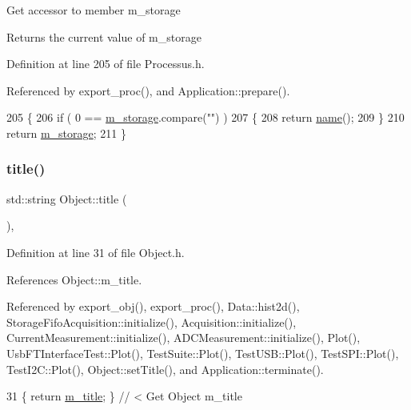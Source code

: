 Get accessor to member m\+\_\+storage \begin{DoxyReturn}{Returns}
the current value of m\+\_\+storage 
\end{DoxyReturn}


Definition at line 205 of file Processus.\+h.



Referenced by export\+\_\+proc(), and Application\+::prepare().


\begin{DoxyCode}
205                        \{
206     \textcolor{keywordflow}{if} ( 0 == \hyperlink{classProcessus_a132b1e71f72327e5a87f0a168c7b6325}{m\_storage}.compare(\textcolor{stringliteral}{""}) )
207     \{
208       \textcolor{keywordflow}{return} \hyperlink{classObject_a300f4c05dd468c7bb8b3c968868443c1}{name}();
209     \}
210     \textcolor{keywordflow}{return} \hyperlink{classProcessus_a132b1e71f72327e5a87f0a168c7b6325}{m\_storage};
211   \}
\end{DoxyCode}
\mbox{\label{classObject_a73a0f1a41828fdd8303dd662446fb6c3}} 
\subsubsection{\texorpdfstring{title()}{title()}}
{\footnotesize\ttfamily std\+::string Object\+::title (\begin{DoxyParamCaption}{ }\end{DoxyParamCaption})\hspace{0.3cm}{\ttfamily [inline]}, {\ttfamily [inherited]}}



Definition at line 31 of file Object.\+h.



References Object\+::m\+\_\+title.



Referenced by export\+\_\+obj(), export\+\_\+proc(), Data\+::hist2d(), Storage\+Fifo\+Acquisition\+::initialize(), Acquisition\+::initialize(), Current\+Measurement\+::initialize(), A\+D\+C\+Measurement\+::initialize(), Plot(), Usb\+F\+T\+Interface\+Test\+::\+Plot(), Test\+Suite\+::\+Plot(), Test\+U\+S\+B\+::\+Plot(), Test\+S\+P\+I\+::\+Plot(), Test\+I2\+C\+::\+Plot(), Object\+::set\+Title(), and Application\+::terminate().


\begin{DoxyCode}
31 \{ \textcolor{keywordflow}{return} \hyperlink{classObject_affbeea1953eb5163573b92fad8f75727}{m\_title};      \} \textcolor{comment}{// < Get Object m\_title}
\end{DoxyCode}
\mbox{\label{classObject_a84f99f70f144a83e1582d1d0f84e4e62}} 
